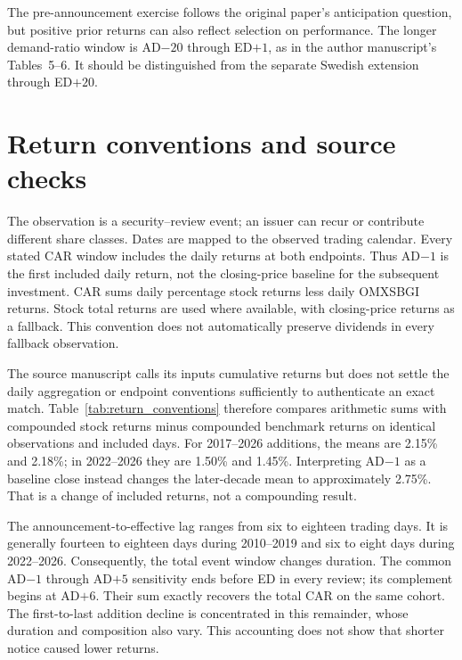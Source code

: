 The pre-announcement exercise follows the original paper's anticipation question, but positive prior returns can also reflect selection on performance. The longer demand-ratio window is AD$-20$ through ED$+1$, as in the author manuscript's Tables~5--6. It should be distinguished from the separate Swedish extension through ED$+20$.


\FloatBarrier

\section{Return conventions and source checks}
\label{app:data}
\label{app:definitions}



The observation is a security--review event; an issuer can recur or contribute different share classes. Dates are mapped to the observed trading calendar. Every stated CAR window includes the daily returns at both endpoints. Thus AD$-1$ is the first included daily return, not the closing-price baseline for the subsequent investment. CAR sums daily percentage stock returns less daily OMXSBGI returns. Stock total returns are used where available, with closing-price returns as a fallback. This convention does not automatically preserve dividends in every fallback observation.

The source manuscript calls its inputs cumulative returns but does not settle the daily aggregation or endpoint conventions sufficiently to authenticate an exact match. Table~\ref{tab:return_conventions} therefore compares arithmetic sums with compounded stock returns minus compounded benchmark returns on identical observations and included days. For 2017--2026 additions, the means are 2.15\% and 2.18\%; in 2022--2026 they are 1.50\% and 1.45\%. Interpreting AD$-1$ as a baseline close instead changes the later-decade mean to approximately 2.75\%. That is a change of included returns, not a compounding result.



The announcement-to-effective lag ranges from six to eighteen trading days. It is generally fourteen to eighteen days during 2010--2019 and six to eight days during 2022--2026. Consequently, the total event window changes duration. The common AD$-1$ through AD$+5$ sensitivity ends before ED in every review; its complement begins at AD$+6$. Their sum exactly recovers the total CAR on the same cohort. The first-to-last addition decline is concentrated in this remainder, whose duration and composition also vary. This accounting does not show that shorter notice caused lower returns.

